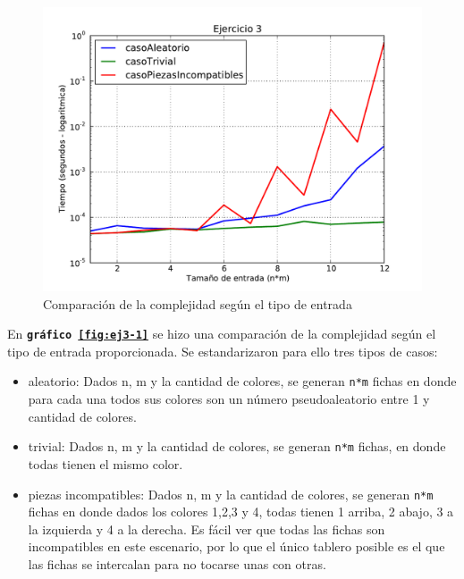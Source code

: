 \documentclass[11pt, a4paper, twoside]{article}
\begin{document}
\begin{figure}[h]
   \begin{center}
   \includegraphics[width=1\textwidth,angle=0]{../ej3/graficos/test_exponencial.pdf}
   \caption{Comparación de la complejidad según el tipo de entrada}
   \label{fig:ej3-2}
   \end{center}
\end{figure}

En \textbf{\texttt{gráfico \ref{fig:ej3-1}}} se hizo una comparación de la
complejidad según el tipo de entrada proporcionada. Se estandarizaron para ello
tres tipos de casos: 
\begin{itemize}

\item aleatorio: Dados n, m y la cantidad de colores, se generan \texttt{n*m}
fichas en donde para cada una todos sus colores son un número pseudoaleatorio
entre 1 y cantidad de colores.

\item trivial: Dados n, m y la cantidad de colores, se generan \texttt{n*m}
fichas, en donde todas tienen el mismo color.

\item piezas incompatibles: Dados n, m y la cantidad de colores, se generan
\texttt{n*m} fichas en donde dados los colores 1,2,3 y 4, todas tienen 1 arriba,
2 abajo, 3 a la izquierda y 4 a la derecha. Es fácil ver que todas las fichas
son incompatibles en este escenario, por lo que el único tablero posible es el
que las fichas se intercalan para no tocarse unas con otras.

\end{itemize}
\end{document}
